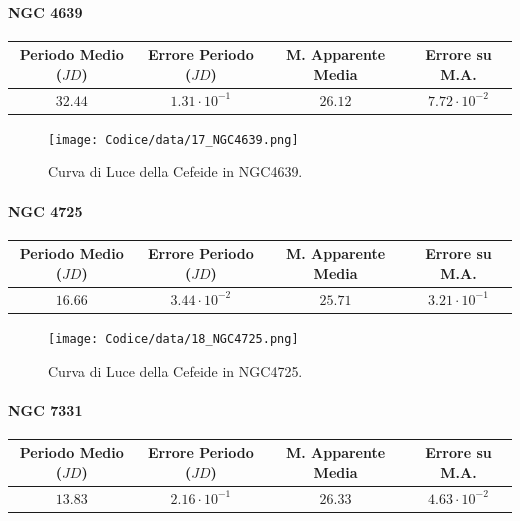 \documentclass{article}
\newcommand{\e}[1]{\cdot 10^{#1}} %
\begin{document}
\paragraph{NGC 4639}
\begin{center}
  \begin{tabular}{cccc}
  \toprule
  Periodo Medio ($JD$) & Errore Periodo ($JD$) & M. Apparente Media &
                                                                  Errore
                                                                      su
                                                                      M.A. \\
  \midrule
  $32.44$ & $1.31\e{-1}$ & $26.12$ & $7.72\e{-2}$ \\
  \bottomrule
 \end{tabular}
\end{center}

\begin{figure}[H]
  \centering
  \texttt{[image: Codice/data/17\_NGC4639.png]}
  \caption{Curva di Luce della Cefeide in NGC4639.}
\end{figure}

\paragraph{NGC 4725}
\begin{center}
  \begin{tabular}{cccc}
  \toprule
  Periodo Medio ($JD$) & Errore Periodo ($JD$) & M. Apparente Media &
                                                                  Errore
                                                                      su
                                                                      M.A. \\
  \midrule
  $16.66$ & $3.44\e{-2}$ & $25.71$ & $3.21\e{-1}$ \\
  \bottomrule
 \end{tabular}
\end{center}

\begin{figure}[H]
  \centering
  \texttt{[image: Codice/data/18\_NGC4725.png]}
  \caption{Curva di Luce della Cefeide in NGC4725.}
\end{figure}

\paragraph{NGC 7331}
\begin{center}
  \begin{tabular}{cccc}
  \toprule
  Periodo Medio ($JD$) & Errore Periodo ($JD$) & M. Apparente Media &
                                                                  Errore
                                                                      su
                                                                      M.A. \\
  \midrule
  $13.83$ & $2.16\e{-1}$ & $26.33$ & $4.63\e{-2}$ \\
  \bottomrule
 \end{tabular}
\end{center}
\end{document}
